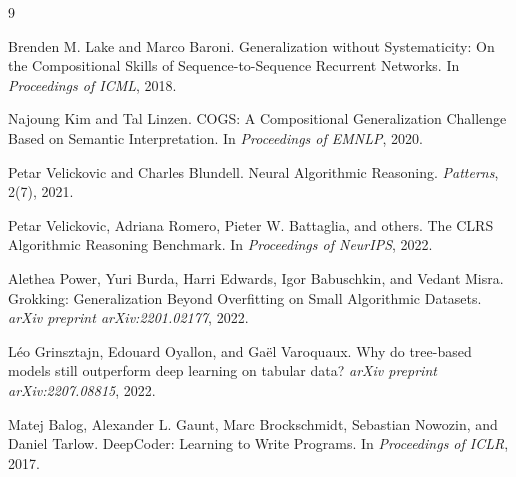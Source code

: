 \documentclass[11pt]{article}
\begin{document}
\begin{thebibliography}{9}

Brenden M. Lake and Marco Baroni.
\newblock Generalization without Systematicity: On the Compositional Skills of Sequence-to-Sequence Recurrent Networks.
\newblock In \emph{Proceedings of ICML}, 2018.

Najoung Kim and Tal Linzen.
\newblock COGS: A Compositional Generalization Challenge Based on Semantic Interpretation.
\newblock In \emph{Proceedings of EMNLP}, 2020.

Petar Velickovic and Charles Blundell.
\newblock Neural Algorithmic Reasoning.
\newblock \emph{Patterns}, 2(7), 2021.

Petar Velickovic, Adriana Romero, Pieter W. Battaglia, and others.
\newblock The CLRS Algorithmic Reasoning Benchmark.
\newblock In \emph{Proceedings of NeurIPS}, 2022.

Alethea Power, Yuri Burda, Harri Edwards, Igor Babuschkin, and Vedant Misra.
\newblock Grokking: Generalization Beyond Overfitting on Small Algorithmic Datasets.
\newblock \emph{arXiv preprint arXiv:2201.02177}, 2022.

Léo Grinsztajn, Edouard Oyallon, and Gaël Varoquaux.
\newblock Why do tree-based models still outperform deep learning on tabular data?
\newblock \emph{arXiv preprint arXiv:2207.08815}, 2022.

Matej Balog, Alexander L. Gaunt, Marc Brockschmidt, Sebastian Nowozin, and Daniel Tarlow.
\newblock DeepCoder: Learning to Write Programs.
\newblock In \emph{Proceedings of ICLR}, 2017.

\end{thebibliography}
\end{document}
